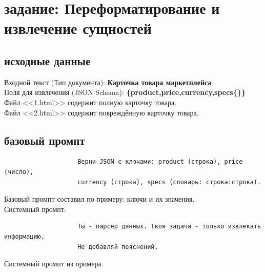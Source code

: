 \section{задание: Переформатирование и извлечение сущностей}
\subsection{исходные данные}
\indent Входной текст (Тип документа): \textbf{Карточка товара маркетплейса} \\
\indent Поля для извлечения (JSON Schema): \textbf{\{product,price,currency,specs\{\}\}} \\
\indent Файл <<1.html>> содержит полную карточку товара. \\
\indent Файл <<2.html>> содержит повреждённую карточку товара. 
\subsection{базовый промпт}
\begin{verbatim}
					Верни JSON с ключами: product (строка), price (число),
					currency (строка), specs (словарь: строка:строка).
\end{verbatim}
Базовый промпт составил по примеру: ключи и их значения. \\
\noindent Системный промпт: 
\begin{verbatim}
					Ты - парсер данных. Твоя задача - только извлекать информацию.
					Не добавляй пояснений.
\end{verbatim}
Системный промпт из примера.
